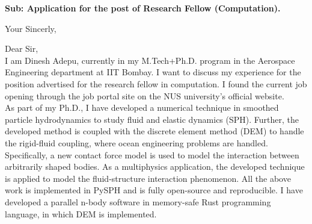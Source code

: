 \documentclass[11pt,a4paper,roman]{moderncv}
\begin{document}
\date{\today}
\opening{\textbf{Sub: Application for the post of Research Fellow (Computation).}}
\closing{Your Sincerly, \vspace{-1em}}


\makelettertitle



Dear Sir,
\\
\vspace{1em} I am Dinesh Adepu, currently in my M.Tech+Ph.D. program in the
Aerospace Engineering department at IIT Bombay. I want to discuss my experience
for the position advertised for the research fellow in computation. I found the
current job opening through the job portal site on the NUS university's official
website.\\

\vspace{1em} As part of my Ph.D., I have developed a numerical technique in
smoothed particle hydrodynamics to study fluid and elastic dynamics (SPH). Further,
the developed method is coupled with the discrete element method (DEM) to handle the
rigid-fluid coupling, where ocean engineering problems are handled.
Specifically, a new contact force model is used to model the interaction between
arbitrarily shaped bodies. As a multiphysics application, the developed
technique is applied to model the fluid-structure interaction phenomenon. All
the above work is implemented in PySPH and is fully open-source and
reproducible. I have developed a parallel n-body software in memory-safe Rust
programming language, in which DEM is implemented.\\
\end{document}
